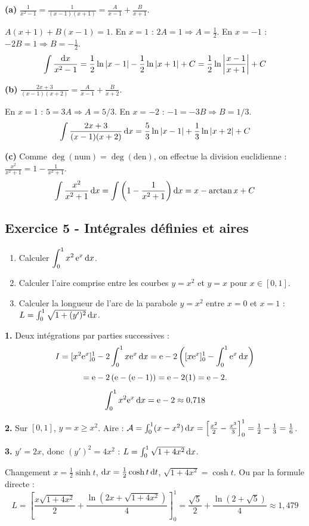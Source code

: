 \documentclass[12pt,a4paper]{article}
\begin{document}
\begin{boitecorrige}
\textbf{(a)} $\frac{1}{x^2-1}=\frac{1}{(x-1)(x+1)}=\frac{A}{x-1}+\frac{B}{x+1}$.

$A(x+1)+B(x-1)=1$. En $x=1$ : $2A=1\Rightarrow A=\frac{1}{2}$. En $x=-1$ : $-2B=1\Rightarrow B=-\frac{1}{2}$.
\[
\int\frac{\mathrm{d} x}{x^2-1} = \frac{1}{2}\ln|x-1|-\frac{1}{2}\ln|x+1|+C = \frac{1}{2}\ln\left|\frac{x-1}{x+1}\right|+C
\]

\textbf{(b)} $\frac{2x+3}{(x-1)(x+2)}=\frac{A}{x-1}+\frac{B}{x+2}$.

En $x=1$ : $5=3A\Rightarrow A=5/3$. En $x=-2$ : $-1=-3B\Rightarrow B=1/3$.
\[
\int\frac{2x+3}{(x-1)(x+2)}\,\mathrm{d} x = \frac{5}{3}\ln|x-1|+\frac{1}{3}\ln|x+2|+C
\]

\textbf{(c)} Comme $\deg(\text{num})=\deg(\text{den})$, on effectue la division euclidienne : $\frac{x^2}{x^2+1}=1-\frac{1}{x^2+1}$.
\[
\int\frac{x^2}{x^2+1}\,\mathrm{d} x = \int\left(1-\frac{1}{x^2+1}\right)\mathrm{d} x = x-\arctan x+C
\]
\end{boitecorrige}

\subsection*{Exercice 5 - Intégrales définies et aires \niveau{\moyen}}

\begin{boiteexercice}
\begin{enumerate}
  \item Calculer $\displaystyle\int_0^1 x^2\,\mathrm{e}^x\,\mathrm{d} x$.
  \item Calculer l'aire comprise entre les courbes $y=x^2$ et $y=x$ pour $x\in[0,1]$.
  \item Calculer la longueur de l'arc de la parabole $y=x^2$ entre $x=0$ et $x=1$ : $L=\int_0^1\sqrt{1+(y')^2}\,\mathrm{d} x$.
\end{enumerate}
\end{boiteexercice}

\begin{boitecorrige}
\textbf{1.} Deux intégrations par parties successives :
\[
I = [x^2\mathrm{e}^x]_0^1 - 2\int_0^1 x\mathrm{e}^x\,\mathrm{d} x = \mathrm{e} - 2\left([x\mathrm{e}^x]_0^1-\int_0^1\mathrm{e}^x\,\mathrm{d} x\right)
\]
\[
= \mathrm{e}-2\left(\mathrm{e}-(\mathrm{e}-1)\right) = \mathrm{e}-2(1) = \mathrm{e}-2.
\]
\[
\int_0^1 x^2\mathrm{e}^x\,\mathrm{d} x = \mathrm{e}-2 \approx 0{,}718
\]

\textbf{2.} Sur $[0,1]$, $y=x\geq x^2$. Aire :
$\mathcal{A} = \int_0^1(x-x^2)\,\mathrm{d} x = \left[\frac{x^2}{2}-\frac{x^3}{3}\right]_0^1 = \frac{1}{2}-\frac{1}{3} = \frac{1}{6}$.

\textbf{3.} $y'=2x$, donc $(y')^2=4x^2$ :
$L = \int_0^1\sqrt{1+4x^2}\,\mathrm{d} x$.

Changement $x=\frac{1}{2}\sinh t$, $\mathrm{d} x=\frac{1}{2}\cosh t\,\mathrm{d} t$, $\sqrt{1+4x^2}=\cosh t$. Ou par la formule directe :
\[
L = \left[\frac{x\sqrt{1+4x^2}}{2}+\frac{\ln(2x+\sqrt{1+4x^2})}{4}\right]_0^1 = \frac{\sqrt{5}}{2}+\frac{\ln(2+\sqrt{5})}{4} \approx 1{,}479
\]
\end{boitecorrige}
\end{document}
